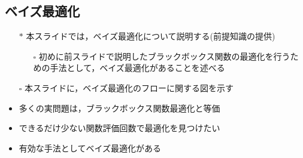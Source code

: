 \documentclass[dvipdfmx, 10.5pt]{beamer}
\begin{document}
\subsection{ベイズ最適化}
\begin{frame}{\insertsubsection}
	\begin{itemize}
		\item[$\ast$] 本スライドでは，ベイズ最適化について説明する(前提知識の提供)
		\begin{itemize}
			\item[$\square$] 初めに前スライドで説明したブラックボックス関数の最適化を行うための手法として，ベイズ最適化があることを述べる
		\end{itemize}
		\item[$\square$] 本スライドに，ベイズ最適化のフローに関する図を示す
		\item 多くの実問題は，ブラックボックス関数最適化と等価
		\item できるだけ少ない関数評価回数で最適化を見つけたい
		\item 有効な手法としてベイズ最適化がある
	\end{itemize}

\end{frame}


\end{document}
